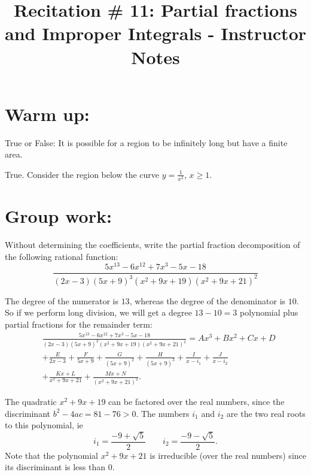 \documentclass[handout,instructornotes]{ximera}
\title{Recitation \# 11: Partial fractions and Improper Integrals - Instructor Notes}
\begin{document}
\begin{abstract}		\end{abstract}
\maketitle




\section{Warm up:}
True or False:  It is possible for a region to be infinitely long but have a finite area.
	\begin{freeResponse}
	True.  Consider the region below the curve $y=\frac{1}{x^2}$, $x \geq 1$.
	\end{freeResponse}
	
\begin{instructorNotes}

\end{instructorNotes}







\section{Group work:}



\begin{problem}
Without determining the coefficients, write the partial fraction decomposition of the following rational function:
	\[
	\frac{5x^{13} - 6x^{12} + 7x^3 - 5x - 18}{(2x-3)(5x+9)^3 (x^2+9x+19)(x^2+9x+21)^2}
	\]
	\begin{freeResponse}
	The degree of the numerator is $13$, whereas the degree of the denominator is $10$.  
	So if we perform long division, we will get a degree $13-10=3$ polynomial plus partial fractions for the remainder term:
		\begin{align*}
		&\frac{5x^{13} - 6x^{12} + 7x^3 - 5x - 18}{(2x-3)(5x+9)^3 (x^2+9x+19)(x^2+9x+21)^2} = Ax^3 + Bx^2 + Cx + D  \\
		&+ \frac{E}{2x-3} + \frac{F}{5x+9} + \frac{G}{(5x+9)^2} + \frac{H}{(5x+9)^3} + \frac{I}{x-i_1} + \frac{J}{x-i_2}  \\
		&+ \frac{Kx+L}{x^2+9x+21} + \frac{Mx+N}{(x^2+9x+21)^2}.
		\end{align*}
		
	The quadratic $x^2+9x+19$ can be factored over the real numbers, since the discriminant $b^2-4ac = 81-76 > 0$.  
	The numbers $i_1$ and $i_2$ are the two real roots to this polynomial, ie
		\[
		i_1 = \frac{-9+\sqrt{5}}{2}	\qquad	i_2=\frac{-9 - \sqrt{5}}{2}.
		\]
	Note that the polynomial $x^2+9x+21$ is irreducible (over the real numbers) since its discriminant is less than $0$.  
	\end{freeResponse}
	
\end{problem}
\end{document}
